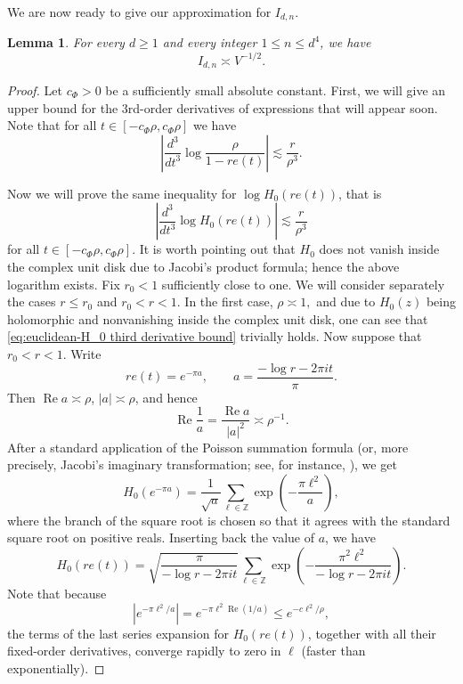 \documentclass{article}
\theoremstyle{plain}
\newtheorem{lemma}[theorem]{Lemma}
\numberwithin{equation}{section}
\begin{document}
We are now ready to give our approximation for $I_{d,n}.$
\begin{lemma}
\label{lemma:euclidean-coefficient-estimate}
  For every $d\geq1$ and every integer $1\leq n\leq d^4$, we have
    \[
    I_{d,n} \asymp V^{-1/2}.
    \]
\end{lemma}
\begin{proof}
  Let \(c_\Phi>0\) be a
sufficiently small absolute constant. First, we will give an upper bound for the 3rd-order derivatives of expressions that will appear soon. Note that for all $t \in [-c_\Phi\rho, c_\Phi\rho]$ we have
\begin{equation}\label{eq:euclidean-geometric-third-derivative}
 \left|\frac{d^3}{d t^3}\log\frac\rho{1-re(t)}\right|
 \lesssim \frac r{\rho^3}.
\end{equation}

Now we will prove the same inequality for \(\log H_0(re(t))\), that is
\begin{equation}\label{eq:euclidean-H_0 third derivative bound}
 \left|\frac{d^3}{d t^3} \log H_0(re(t))\right|
 \lesssim \frac r{\rho^3}
\end{equation}
for all $t \in [-c_\Phi\rho, c_\Phi\rho]$. It is worth pointing out that $H_0$ does not vanish inside the complex unit disk due to Jacobi's product formula; hence the above logarithm exists.
Fix $r_0<1$ sufficiently close to
one. We will consider separately the cases $r\le r_0$ and $r_0<r<1$. In the first case, $\rho \asymp 1,$ and due to $H_0(z)$ being holomorphic and nonvanishing inside the complex unit disk, one can see that \eqref{eq:euclidean-H_0 third derivative bound} trivially holds.
Now suppose that $r_0<r<1$. Write
\[
 re(t)=e^{-\pi a},
 \qquad
 a=\frac{-\log r-2\pi i t}{\pi}.
\]
Then $\operatorname{Re}a\asymp\rho$, $|a|\asymp\rho$, and hence
\[
 \operatorname{Re}\frac1a
 =\frac{\operatorname{Re}a}{|a|^2}\asymp \rho^{-1}.
\]
After a standard application of the Poisson summation formula (or, more precisely, Jacobi's imaginary transformation; see, for instance,
\cite[\S~21.51, pp.~475--476]{WhittakerWatson}), we get
\[
 H_0(e^{-\pi a})
 =\frac{1}{\sqrt{a}}
 \sum_{\ell\in\mathbb Z}
 \exp\left(-\frac{\pi\ell^2}{a}\right),
\]
where the branch of the square root is chosen so that it agrees with the standard square root on positive reals. Inserting back the value of $a$, we have
\[
 H_0(re(t))
 =\sqrt{\frac{\pi}{-\log r-2\pi i t}}
 \sum_{\ell\in\mathbb Z}
 \exp\left(-\frac{\pi^2\ell^2}{-\log r-2\pi i t}\right).
\]
Note that because
\[
 |e^{-\pi \ell^2/a}|
 =e^{-\pi \ell^2 \operatorname{Re}(1/a)}
 \le e^{-c\ell^2/\rho},
\]
the terms of the last series expansion for $H_0(re(t))$, together with all their fixed-order derivatives, converge rapidly to zero in $\ell$ (faster than exponentially).


\end{proof}
\end{document}
